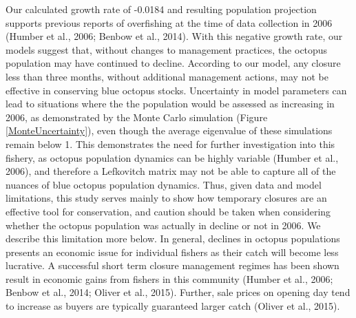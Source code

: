 \documentclass[
]{article}
\begin{document}
Our calculated growth rate of -0.0184 and resulting population projection supports previous reports of overfishing at the time of data collection in 2006 (Humber et al., 2006; Benbow et al., 2014). With this negative growth rate, our models suggest that, without changes to management practices, the octopus population may have continued to decline. According to our model, any closure less than three months, without additional management actions, may not be effective in conserving blue octopus stocks. Uncertainty in model parameters can lead to situations where the the population would be assessed as increasing in 2006, as demonstrated by the Monte Carlo simulation (Figure \ref{MonteUncertainty}), even though the average eigenvalue of these simulations remain below 1. This demonstrates the need for further investigation into this fishery, as octopus population dynamics can be highly variable (Humber et al., 2006), and therefore a Lefkovitch matrix may not be able to capture all of the nuances of blue octopus population dynamics. Thus, given data and model limitations, this study serves mainly to show how temporary closures are an effective tool for conservation, and caution should be taken when considering whether the octopus population was actually in decline or not in 2006. We describe this limitation more below. In general, declines in octopus populations presents an economic issue for individual fishers as their catch will become less lucrative. A successful short term closure management regimes has been shown result in economic gains from fishers in this community (Humber et al., 2006; Benbow et al., 2014; Oliver et al., 2015). Further, sale prices on opening day tend to increase as buyers are typically guaranteed larger catch (Oliver et al., 2015).
\end{document}
